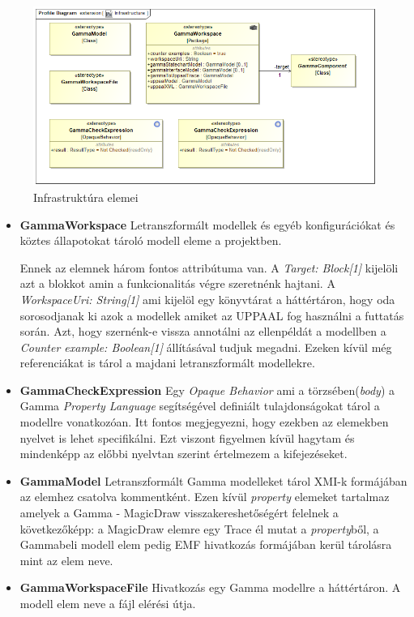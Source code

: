 \begin{figure}[!ht]
	\centering
	\includegraphics[width=120mm, keepaspectratio]{figures/contribution/Infrastructure.png}
	\caption{Infrastruktúra elemei}
	\label{fig:Infrastructure}
\end{figure}


\begin{itemize}
	\item \textbf{GammaWorkspace} \newline
	Letranszformált modellek és egyéb konfigurációkat és köztes állapotokat tároló modell eleme a projektben.
	
	Ennek az elemnek három fontos attribútuma van. A \emph{Target: Block[1]} kijelöli azt a blokkot amin a funkcionalitás végre szeretnénk hajtani. A \emph{WorkspaceUri: String[1]} ami kijelöl egy könyvtárat a háttértáron, hogy oda sorosodjanak ki azok a modellek amiket az UPPAAL fog használni a futtatás során. Azt, hogy szernénk-e vissza annotálni az ellenpéldát a modellben a \emph{Counter example: Boolean[1]} állításával tudjuk megadni. Ezeken kívül még referenciákat is tárol a majdani letranszformált modellekre.
	
	\item \textbf{GammaCheckExpression} \newline
	Egy \emph{Opaque Behavior} ami a törzsében(\emph{body}) a Gamma \emph{Property Language} segítségével definiált tulajdonságokat tárol a modellre vonatkozóan. Itt fontos megjegyezni, hogy ezekben az elemekben nyelvet is lehet specifikálni. Ezt viszont figyelmen kívül hagytam és mindenképp az előbbi nyelvtan szerint értelmezem a kifejezéseket.

	\item \textbf{GammaModel} \newline
	Letranszformált Gamma modelleket tárol XMI-k formájában az elemhez csatolva kommentként. Ezen kívül \emph{property} elemeket tartalmaz amelyek a Gamma - MagicDraw visszakereshetőségért felelnek a következőképp: a MagicDraw elemre egy Trace él mutat a \emph{property}ből, a Gammabeli modell elem pedig EMF hivatkozás formájában kerül tárolásra mint az elem neve.
	

	\item \textbf{GammaWorkspaceFile} \newline
	Hivatkozás egy Gamma modellre a háttértáron. A modell elem neve a fájl elérési útja.
	
\end{itemize}

